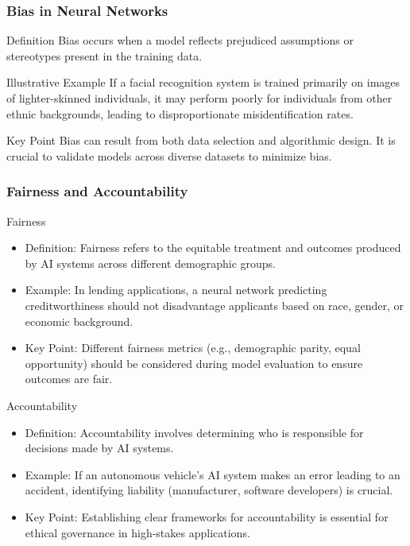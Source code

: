 \documentclass{beamer}
\begin{document}
\begin{frame}[fragile]
    \frametitle{Bias in Neural Networks}
    \begin{block}{Definition}
        Bias occurs when a model reflects prejudiced assumptions or stereotypes present in the training data.
    \end{block}
    \begin{block}{Illustrative Example}
        If a facial recognition system is trained primarily on images of lighter-skinned individuals, it may perform poorly for individuals from other ethnic backgrounds, leading to disproportionate misidentification rates.
    \end{block}
    \begin{block}{Key Point}
        Bias can result from both data selection and algorithmic design. It is crucial to validate models across diverse datasets to minimize bias.
    \end{block}
\end{frame}

\begin{frame}[fragile]
    \frametitle{Fairness and Accountability}
    \begin{block}{Fairness}
        \begin{itemize}
            \item Definition: Fairness refers to the equitable treatment and outcomes produced by AI systems across different demographic groups.
            \item Example: In lending applications, a neural network predicting creditworthiness should not disadvantage applicants based on race, gender, or economic background.
            \item Key Point: Different fairness metrics (e.g., demographic parity, equal opportunity) should be considered during model evaluation to ensure outcomes are fair.
        \end{itemize}
    \end{block}

    \begin{block}{Accountability}
        \begin{itemize}
            \item Definition: Accountability involves determining who is responsible for decisions made by AI systems.
            \item Example: If an autonomous vehicle's AI system makes an error leading to an accident, identifying liability (manufacturer, software developers) is crucial.
            \item Key Point: Establishing clear frameworks for accountability is essential for ethical governance in high-stakes applications.
        \end{itemize}
    \end{block}
\end{frame}
\end{document}
